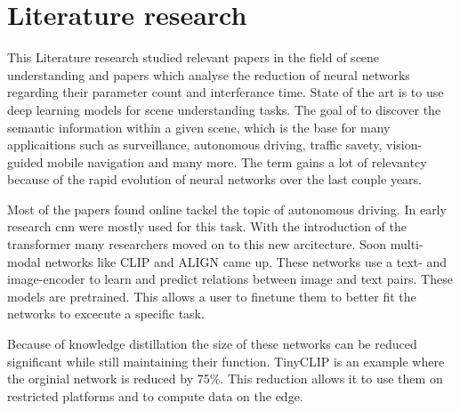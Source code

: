 \chapter{Literature research}

This Literature research studied relevant papers in the field of scene understanding
and papers which analyse the reduction of neural networks regarding their parameter count and interferance time.
State of the art is to use deep learning models for scene understanding tasks.
The goal of to discover the semantic information within a given scene, which is the base for many applicaitions such as surveillance, autonomous driving, traffic savety, vision-guided mobile navigation and many more.
The term gains a lot of relevantcy because of the rapid evolution of neural networks over the last couple years.

Most of the papers found online tackel the topic of autonomous driving\cite{sceneunderstandingautdriving1}.
In early research \acrfull{cnn}\cite{SegNet} were mostly used for this task.
With the introduction of the transformer \cite{attentionisallyouneed} many researchers moved on to this new arcitecture.
Soon multi-modal networks like CLIP\cite{clip} and ALIGN\cite{ALIGN} came up.
These networks use a text- and image-encoder to learn and predict relations between image and text pairs.
These models are pretrained.
This allows a user to finetune them to better fit the networks to excecute a specific task.

Because of knowledge distillation\cite{knowledgedistillation} the size of these networks can be reduced significant while still maintaining their function.
TinyCLIP\cite{tinyclip} is an example where the orginial network is reduced by 75\%.
This reduction allows it to use them on restricted platforms and to compute data on the edge.

